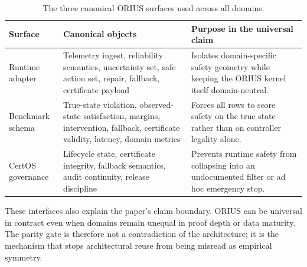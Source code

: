 \begin{table}[t]
\centering
\caption{The three canonical ORIUS surfaces used across all domains.}
\label{tab:ieee-contract-surfaces}
\small
\begin{tabularx}{\textwidth}{@{}p{}p{}p{}@{}}
\toprule
\textbf{Surface} & \textbf{Canonical objects} & \textbf{Purpose in the universal claim}\\
\midrule
Runtime adapter & Telemetry ingest, reliability semantics, uncertainty set, safe action set, repair, fallback, certificate payload & Isolates domain-specific safety geometry while keeping the ORIUS kernel itself domain-neutral.\\
Benchmark schema & True-state violation, observed-state satisfaction, margins, intervention, fallback, certificate validity, latency, domain metrics & Forces all rows to score safety on the true state rather than on controller legality alone.\\
CertOS governance & Lifecycle state, certificate integrity, fallback semantics, audit continuity, release discipline & Prevents runtime safety from collapsing into an undocumented filter or ad hoc emergency stop.\\
\bottomrule
\end{tabularx}
\end{table}

These interfaces also explain the paper's claim boundary. ORIUS can be universal in
contract even when domains remain unequal in proof depth or data maturity. The parity
gate is therefore not a contradiction of the architecture; it is the mechanism that
stops architectural reuse from being misread as empirical symmetry.
